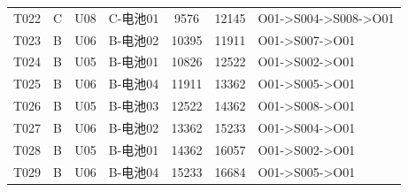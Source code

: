 \begin{center}
\begin{longtable}{llllccl}
T022 & C & U08 & C-电池01 & 9576 & 12145 & O01->S004->S008->O01 \\
T023 & B & U06 & B-电池02 & 10395 & 11911 & O01->S007->O01 \\
T024 & B & U05 & B-电池01 & 10826 & 12522 & O01->S002->O01 \\
T025 & B & U06 & B-电池04 & 11911 & 13362 & O01->S005->O01 \\
T026 & B & U05 & B-电池03 & 12522 & 14362 & O01->S008->O01 \\
T027 & B & U06 & B-电池02 & 13362 & 15233 & O01->S004->O01 \\
T028 & B & U05 & B-电池01 & 14362 & 16057 & O01->S002->O01 \\
T029 & B & U06 & B-电池04 & 15233 & 16684 & O01->S005->O01 \\
\hline\end{longtable}\end{center}
